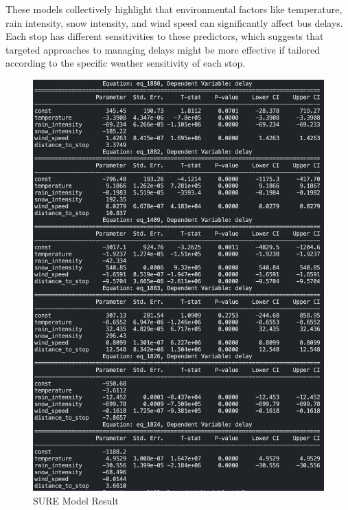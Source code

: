 \documentclass[conference]{IEEEtran}
\begin{document}
These models collectively highlight that environmental factors like temperature, rain intensity, snow intensity, and wind speed can significantly affect bus delays. Each stop has different sensitivities to these predictors, which suggests that targeted approaches to managing delays might be more effective if tailored according to the specific weather sensitivity of each stop.


\begin{figure}
    \centering
    \includegraphics[width=1\linewidth]{sure_result.png}
    \caption{SURE Model Result}
    \label{fig:enter-label}
\end{figure}
\end{document}
